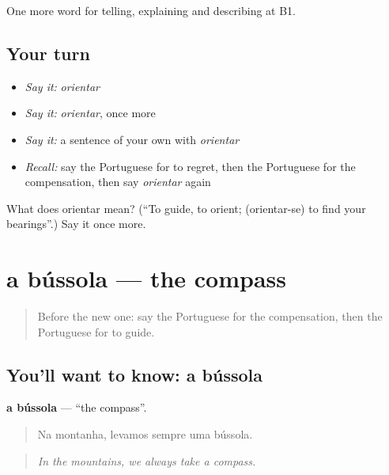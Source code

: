 \begin{grammarlens}[title={What you've built}]
One more word for telling, explaining and describing at B1.
\end{grammarlens}

\subsection*{Your turn}
\begin{itemize}
\raggedright
  \item \emph{Say it:} \emph{orientar}
  \item \emph{Say it:} \emph{orientar}, once more
  \item \emph{Say it:} a sentence of your own with \emph{orientar}
  \item \emph{Recall:} say the Portuguese for to regret, then the Portuguese for the compensation, then say \emph{orientar} again
\end{itemize}

\begin{tcolorbox}[breakable,colback=teal!4,colframe=teal!35!black,title={Before you move on}]
What does orientar mean? (\textquotedblleft{}To guide, to orient; (orientar-se) to find your bearings\textquotedblright{}.) Say it once more.
\end{tcolorbox}
\section[a bússola]{a bússola — the compass}

\label{lesson:PT-C435-bussola}



\begin{quote}
Before the new one: say the Portuguese for the compensation, then the Portuguese for to guide.
\end{quote}

\subsection*{You'll want to know: a bússola}
\textbf{a bússola} — \textquotedblleft{}the compass\textquotedblright{}.

\begin{quote}
Na montanha, levamos sempre uma bússola.
\end{quote}

\begin{quote}
\emph{In the mountains, we always take a compass.}
\end{quote}

